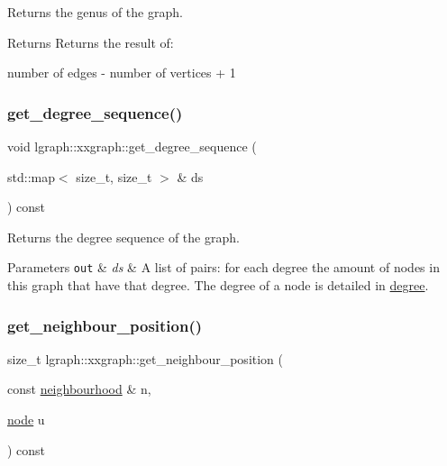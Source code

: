 Returns the genus of the graph. 

\begin{DoxyReturn}{Returns}
Returns the result of\+: \begin{DoxyVerb}number of edges - number of vertices + 1
\end{DoxyVerb}
 
\end{DoxyReturn}
\mbox{\label{classlgraph_1_1xxgraph_a5b21b51f5f9c55c05c0e8e5bc836bf87}} 
\subsubsection{\texorpdfstring{get\+\_\+degree\+\_\+sequence()}{get\_degree\_sequence()}}
{\footnotesize\ttfamily void lgraph\+::xxgraph\+::get\+\_\+degree\+\_\+sequence (\begin{DoxyParamCaption}\item[{std\+::map$<$ size\+\_\+t, size\+\_\+t $>$ \&}]{ds }\end{DoxyParamCaption}) const}



Returns the degree sequence of the graph. 


\begin{DoxyParams}[1]{Parameters}
\mbox{\tt out}  & {\em ds} & A list of pairs\+: for each degree the amount of nodes in this graph that have that degree. The degree of a node is detailed in \hyperlink{classlgraph_1_1xxgraph_a20ebc2927ee8fb8bb0a2c3b448d9ed78}{degree}. \\
\hline
\end{DoxyParams}
\mbox{\label{classlgraph_1_1xxgraph_abb0c474cb162940aba3439124c1202d7}} 
\subsubsection{\texorpdfstring{get\+\_\+neighbour\+\_\+position()}{get\_neighbour\_position()}}
{\footnotesize\ttfamily size\+\_\+t lgraph\+::xxgraph\+::get\+\_\+neighbour\+\_\+position (\begin{DoxyParamCaption}\item[{const \hyperlink{namespacelgraph_a052e7766c13f3a43cec0aec8173fdede}{neighbourhood} \&}]{n,  }\item[{\hyperlink{namespacelgraph_a397169dd66adf725210a30fb7251773e}{node}}]{u }\end{DoxyParamCaption}) const\hspace{0.3cm}{\ttfamily [protected]}}



